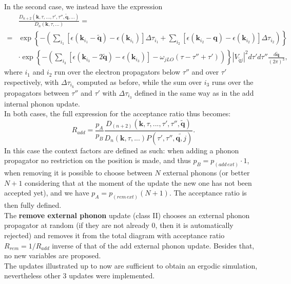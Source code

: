 In the second case, we instead have the expression
\begin{equation}
\begin{split}
    &\frac{D_{n+2}(\mathbf{k},\tau,...,\tau',\tau'',\tilde{\mathbf{q}},...)}{D_n(\mathbf{k},\tau,...)}=\\
    =&\exp\left\{-\left(\sum_{i_1}\left[\epsilon(\mathbf{k}_{i_1}-\tilde{\mathbf{q}})-\epsilon(\mathbf{k}_{i_1})\right]\Delta\tau_{i_1}+\sum_{i_2}\left[\epsilon(\mathbf{k}_{i_2}-\mathbf{q})-\epsilon(\mathbf{k}_{i_2})\right]\Delta\tau_{i_2}\right)\right\}\\
    &\cdot\exp\left\{-\left(\sum_{i_3}\left[\epsilon(\mathbf{k}_{i_3}-2\tilde{\mathbf{q}})-\epsilon(\mathbf{k}_{i_3})\right]-\omega_{jLO}(\tau-\tau''+\tau')\right)\right\}|V_{\tilde{q}j}|^2d\tau'd\tau''\frac{d\tilde{\mathbf{q}}}{(2\pi)^3},
\end{split}
\end{equation}
where $i_1$ and $i_2$ run over the electron propagators below $\tau''$ and over $\tau'$ respectively, with $\Delta\tau_{i_k}$ computed as before, while the sum over $i_3$ 
runs over the propagators between $\tau''$ and $\tau'$ with $\Delta\tau_{i_3}$ defined in the same way as in the add internal phonon update.\\
In both cases, the full expression for the acceptance ratio thus becomes:
\begin{equation}
    R_{add}=\frac{p_A}{p_B}\frac{D_{(n+2)}(\mathbf{k},\tau,...,\tau',\tau'',\tilde{\mathbf{q}})}{D_n(\mathbf{k},\tau,...)P(\tau',\tau'',\tilde{\mathbf{q},j})}.
\end{equation}
In this case the context factors are defined as such: when adding a phonon propagator no restriction on the position is made, and thus 
$p_B=p_{(add\hspace{2pt}ext)}\cdot 1$, when removing it is possible to choose between $N$ external phonons (or better $N+1$ considering that at the moment of the 
update the new one has not been accepted yet), and we have $p_A=p_{(rem\hspace{2pt}ext)}(N+1)$. The acceptance ratio is then fully defined.\\
The \textbf{remove external phonon} update (class II) chooses an external phonon propagator at random (if they are not already 0, then it is automatically rejected) 
and removes it from the total diagram with acceptance ratio $R_{rem}=1/R_{add}$ inverse of that of the add external phonon update. Besides that, no 
new variables are proposed.\\
The updates illustrated up to now are sufficient to obtain an ergodic simulation, nevertheless other 3 updates were implemented.
